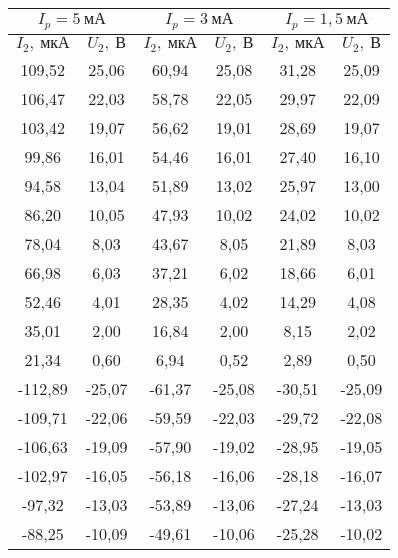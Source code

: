 \begin{table}[H]
\centering
\begin{tabular}{|c|c||c|c||c|c|}
\hline
\multicolumn{2}{|c||}{$I_p = 5 \
\text{мА}$} & \multicolumn{2}{c||}{$I_p
= 3 \ \text{мА}$} &
\multicolumn{2}{c|}{$I_p = 1,5 \
\text{мА}$} \\ \hline
$I_2, \ \text{мкА}$  & $U_2, \ \text{В}$
& $I_2, \ \text{мкА}$  & $U_2, \
\text{В}$         & $I_2, \ \text{мкА}$  & $U_2, \ \text{В}$        \\ \hline
109,52      & 25,06     & 60,94      & 25,08     & 31,28      & 25,09     \\ \hline
106,47      & 22,03     & 58,78      & 22,05     & 29,97      & 22,09     \\ \hline
103,42      & 19,07     & 56,62      & 19,01     & 28,69      & 19,07     \\ \hline
99,86       & 16,01     & 54,46      & 16,01     & 27,40      & 16,10     \\ \hline
94,58       & 13,04     & 51,89      & 13,02     & 25,97      & 13,00     \\ \hline
86,20       & 10,05     & 47,93      & 10,02     & 24,02      & 10,02     \\ \hline
78,04       & 8,03      & 43,67      & 8,05      & 21,89      & 8,03      \\ \hline
66,98       & 6,03      & 37,21      & 6,02      & 18,66      & 6,01      \\ \hline
52,46       & 4,01      & 28,35      & 4,02      & 14,29      & 4,08      \\ \hline
35,01       & 2,00      & 16,84      & 2,00      & 8,15       & 2,02      \\ \hline
21,34       & 0,60      & 6,94       & 0,52      & 2,89       & 0,50      \\ \hline
-112,89     & -25,07    & -61,37     & -25,08    & -30,51     & -25,09    \\ \hline
-109,71     & -22,06    & -59,59     & -22,03    & -29,72     & -22,08    \\ \hline
-106,63     & -19,09    & -57,90     & -19,02    & -28,95     & -19,05    \\ \hline
-102,97     & -16,05    & -56,18     & -16,06    & -28,18     & -16,07    \\ \hline
-97,32      & -13,03    & -53,89     & -13,06    & -27,24     & -13,03    \\ \hline
-88,25      & -10,09    & -49,61     & -10,06    & -25,28     & -10,02    \\ \hline

\end{tabular}
\end{table}
